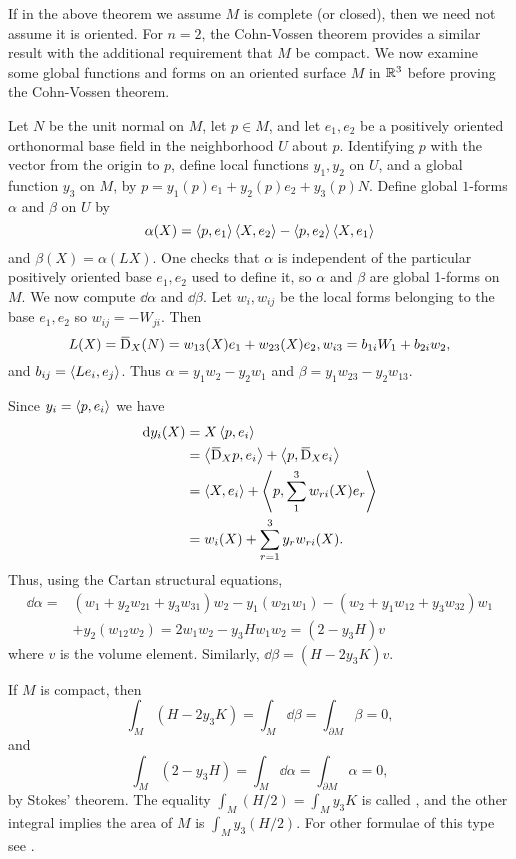 \documentclass[../main]{subfiles}
\begin{document}
If in the above theorem we assume $M$ is complete (or closed), then we need not assume it is oriented. For $n=2$, the Cohn-Vossen theorem provides a similar result with the additional requirement that $M$ be compact. We now examine some global functions and forms on an oriented surface $M$ in $\mathbb{R}^3$ before proving the Cohn-Vossen theorem.

Let $N$ be the unit normal on $M$, let $p\in M$, and let $e_1, e_2$ be a positively oriented orthonormal base field in the neighborhood $U$ about $p$. Identifying $p$ with the vector from the origin to $p$, define local functions $y_1, y_2$ on $U$, and a global function $y_3$ on $M$, by $p=y_1(p) e_1+y_2(p)e_2+y_3(p)N$. Define global $1$-forms $\alpha$ and $\beta$ on $U$ by \[\alpha(X)=\left\langle p,e_1\right\rangle\left\langle X,e_2\right\rangle-\left\langle p,e_2\right\rangle\left\langle X,e_1\right\rangle\] and $\beta(X)=\alpha(L X)$. One checks that $\alpha$ is independent of the particular positively oriented base $e_1, e_2$ used to define it, so $\alpha$ and $\beta$ are global 1-forms on $M$. We now compute $\dd\alpha$ and $\dd\beta$. Let $w_i, w_{i j}$ be the local forms belonging to the base $e_1,e_2$ so $w_{i j}=-W_{ji}$. Then \[L(X)=\covariant_X(N)=w_{13}(X)e_1+w_{23}(X) e_2, w_{i 3}=b_{1 i} W_1+b_{2 i} w_2,\] and $b_{i j}=\left\langle L e_i,e_j\right\rangle$. Thus $\alpha=y_1w_2-y_2 w_1$ and $\beta=y_1w_{23}-y_2w_{13}$.

Since $y_i=\left\langle p,e_i\right\rangle$ we have 
\begin{align*}
  \dd y_i(X)&=X\ip{p}{e_i}\\
  &=\ip{\covariant_Xp}{e_i}+\ip{p}{\covariant_Xe_i}\\
  &=\ip{X}{e_i}+\ip{p}{\sum_1^3w_{r i}(X)e_r}\\
  &=w_i(X)+\sum_{r=1}^3 y_r w_{r i}(X). 
\end{align*}
Thus, using the Cartan structural equations,
\begin{align*}
    \dd\alpha=&(w_1+y_2 w_{21}+y_3 w_{31})w_2-y_1(w_{21}w_1)-(w_2+y_1w_{12}+y_3w_{32})w_1\\
    &+y_2(w_{12}w_2)=2 w_1 w_2-y_3Hw_1 w_2=(2-y_3 H) v
\end{align*}
where $v$ is the volume element. Similarly, $\dd\beta=(H-2y_3 K)v$.

If $M$ is compact, then \[\int_M(H-2 y_3K)=\int_M\dd\beta=\int_{\partial M} \beta=0,\] and \[\int_M(2-y_3H)=\int_M\dd\alpha=\int_{\partial M}\alpha=0,\] by Stokes' theorem. The equality $\int_M(H/2)=\int_My_3K$ is called , and the other integral implies the area of $M$ is $\int_My_3(H/2)$. For other formulae of this type see \cite{Bonnesen1974theorie}.
\end{document}
